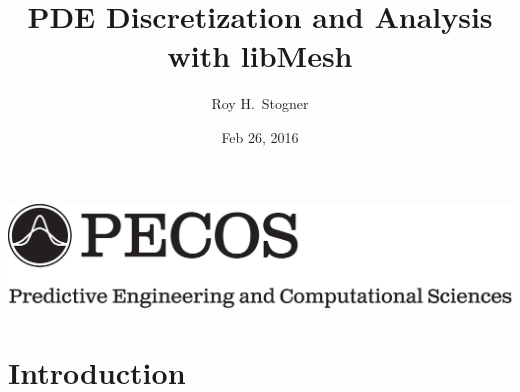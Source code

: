 \documentclass[mathserif]{beamer}
\date{Feb 26, 2016}
\author{Roy H.~Stogner\inst{1}}
\institute{\inst{1}The University of Texas at Austin}
\title[libMesh]{PDE Discretization and Analysis with libMesh}
\begin{document}
\begin{frame}
\begin{center}
\includegraphics[width=.8\linewidth]{grand_logo}\\
\end{center}
\titlepage
\end{frame}


\section{Introduction}
\end{document}
